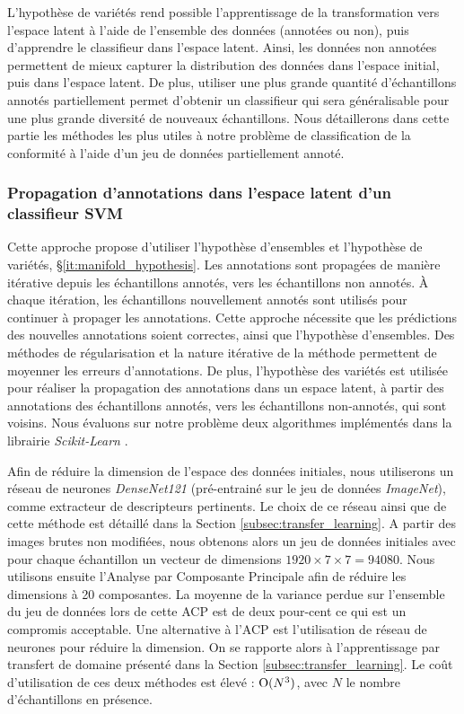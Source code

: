 L'hypothèse de variétés rend possible l'apprentissage de la transformation vers l'espace latent à l'aide de l'ensemble des données (annotées ou non), puis d'apprendre le classifieur dans l'espace latent.
Ainsi, les données non annotées permettent de mieux capturer la distribution des données dans l'espace initial, puis dans l'espace latent.
De plus, utiliser une plus grande quantité d'échantillons annotés partiellement permet d'obtenir un classifieur qui sera généralisable pour une plus grande diversité de nouveaux échantillons.
Nous détaillerons dans cette partie les méthodes les plus utiles à notre problème de classification de la conformité à l'aide d'un jeu de données partiellement annoté.

\subsubsection{Propagation d'annotations dans l'espace latent d'un classifieur SVM} \label{subsubsec:propagation}
Cette approche propose d'utiliser l'hypothèse d'ensembles et l'hypothèse de variétés, §\ref{it:manifold_hypothesis}.
Les annotations sont propagées de manière itérative depuis les échantillons annotés, vers les échantillons non annotés.
À chaque itération, les échantillons nouvellement annotés sont utilisés pour continuer à propager les annotations.
Cette approche nécessite que les prédictions des nouvelles annotations soient correctes, ainsi que l'hypothèse d'ensembles.
Des méthodes de régularisation et la nature itérative de la méthode permettent de moyenner les erreurs d'annotations.
De plus, l'hypothèse des variétés est utilisée pour réaliser la propagation des annotations dans un espace latent, à partir des annotations des échantillons annotés, vers les échantillons non-annotés, qui sont voisins.
Nous évaluons sur notre problème deux algorithmes implémentés dans la librairie \textit{Scikit-Learn} \cite{pedregosa_scikit-learn_2011}.

Afin de réduire la dimension de l'espace des données initiales, nous utiliserons un réseau de neurones \textit{DenseNet121} \cite{huang_densely_2016} (pré-entrainé sur le jeu de données \textit{ImageNet}), comme extracteur de descripteurs pertinents.
Le choix de ce réseau ainsi que de cette méthode est détaillé dans la Section \ref{subsec:transfer_learning}.
A partir des images brutes non modifiées, nous obtenons alors un jeu de données initiales avec pour chaque échantillon un vecteur de dimensions $1920 \times 7 \times 7 = 94 080$.
Nous utilisons ensuite l'Analyse par Composante Principale \cite{jolliffe_principal_2002} afin de réduire les dimensions à 20 composantes. La moyenne de la variance perdue sur l'ensemble du jeu de données lors de cette ACP est de deux pour-cent ce qui est un compromis acceptable.
Une alternative à l'ACP est l'utilisation de réseau de neurones pour réduire la dimension.
On se rapporte alors à l'apprentissage par transfert de domaine présenté dans la Section \ref{subsec:transfer_learning}.
Le coût d'utilisation de ces deux méthodes est élevé : $\operatorname{O}(N^3)$, avec $N$ le nombre d'échantillons en présence.

